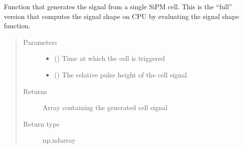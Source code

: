 \documentclass[letterpaper,10pt,english]{sphinxmanual}
\begin{document}

\begin{fulllineitems}
\label{\detokenize{structure:libs.libGPU.PulseCPU}}
Function that generates the signal from a single SiPM cell. This is the “full” version that computes the signal shape on CPU by evaluating the signal shape function.
\begin{quote}\begin{description}
\item[{Parameters}] \leavevmode\begin{itemize}
\item {} 
 () \textendash{} Time at which the cell is triggered

\item {} 
 () \textendash{} The relative pulse height of the cell signal

\end{itemize}

\item[{Returns}] \leavevmode
{} \textendash{} Array containing the generated cell signal

\item[{Return type}] \leavevmode
np.ndarray

\end{description}\end{quote}

\end{fulllineitems}

\end{document}
